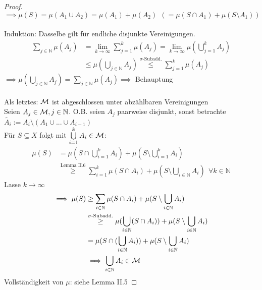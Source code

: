 \documentclass[11pt,a4paper,fleqn,openany]{report}
\begin{document}
\begin{proof}
      $\implies \mu(S) = \mu(A_1 \cup A_2) = \mu(A_1) + \mu(A_2) \ \ (= \mu(S \cap A_1) + \mu(S \setminus A_1))$\\ \\
      Induktion: Dasselbe gilt für endliche disjunkte Vereinigungen. \begin{align*}
        \sum\limits_{j \in \mathbb{N}} \mu(A_j)
        &= \lim\limits_{k \to \infty} \sum\limits_{j = 1}^k \mu(A_j)
        = \lim\limits_{k \to \infty} \mu(\bigcup\limits_{j=1}^k A_j)\\
        &\leq \mu(\bigcup\limits_{j \in \mathbb{N}} A_j)
        \stackrel{\sigma \text{-Subadd.}}{\leq} \sum\limits_{j=1}^k \mu(A_j)
      \end{align*}
      $\implies \mu(\bigcup\limits_{j \in \mathbb{N}} A_j) = \sum\limits_{j \in \mathbb{N}} \mu(A_j) \implies$ Behauptung\\ \\
      Als letztes: $\mathcal{M}$ ist abgeschlossen unter abzählbaren Vereinigungen\\
      Seien $A_j \in \mathcal{M}, j \in \mathbb{N}$. O.B. seien $A_j$ paarweise disjunkt, sonst betrachte \\
      $\tilde{A_i} := A_i \setminus (A_1 \cup ... \cup A_{i-1})$\\
      Für $S \subseteq X$ folgt mit $\bigcup\limits_{i=1}^k A_i \in \mathcal{M}$:
      \begin{align*}
        \mu(S) &= \mu(S \cap \bigcup\limits_{i=1}^k A_i) + \mu(S \setminus \bigcup\limits_{i=1}^k A_i)\\
        &\stackrel{\text{Lemma II.6}}{\geq} \sum\limits_{i=1}^k \mu(S \cap A_i) + \mu(S \setminus \bigcup\limits_{i \in \mathbb{N}} A_i) \ \ \forall k \in \mathbb{N}
      \end{align*}
      Lasse $k \to \infty$\\
      \begin{align*}
        \implies \mu(S) &\geq \sum\limits_{i \in \mathbb{N}} \mu(S \cap A_i) + \mu(S \setminus \bigcup\limits_{i \in \mathbb{N}} A_i)\\
        &\stackrel{\sigma\text{-Subadd.}}{\geq} \mu(\bigcup\limits_{i \in \mathbb{N}} (S \cap A_i)) + \mu(S \setminus \bigcup\limits_{i \in \mathbb{N}} A_i)\\
        &= \mu(S \cap (\bigcup\limits_{i \in \mathbb{N}} A_i)) + \mu(S \setminus \bigcup\limits_{i \in \mathbb{N}} A_i)\\
        &\implies \bigcup\limits_{i \in \mathbb{N}} A_i \in \mathcal{M}
      \end{align*}
      Vollständigkeit von $\mu$: siehe Lemma II.5
    \end{proof}
\end{document}
